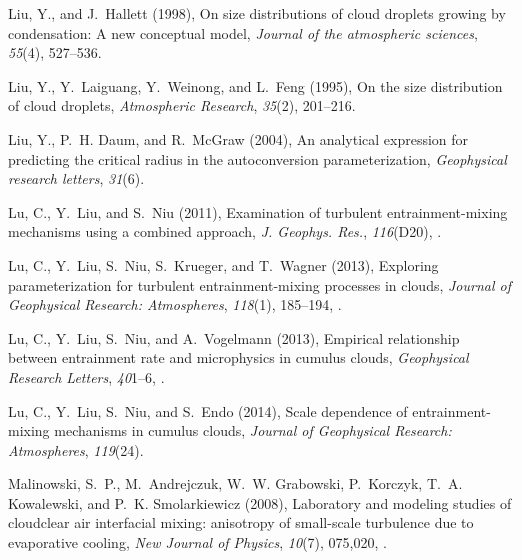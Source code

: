 \documentclass[draft,linenumbers]{agujournal}
\begin{document}
\begin{thebibliography}{60}
Liu, Y., and J.~Hallett (1998), On size distributions of cloud droplets growing
  by condensation: A new conceptual model, \textit{Journal of the atmospheric
  sciences}, \textit{55}(4), 527--536.

Liu, Y., Y.~Laiguang, Y.~Weinong, and L.~Feng (1995), On the size distribution
  of cloud droplets, \textit{Atmospheric Research}, \textit{35}(2), 201--216.

Liu, Y., P.~H. Daum, and R.~McGraw (2004), An analytical expression for
  predicting the critical radius in the autoconversion parameterization,
  \textit{Geophysical research letters}, \textit{31}(6).

Lu, C., Y.~Liu, and S.~Niu (2011), Examination of turbulent entrainment-mixing
  mechanisms using a combined approach, \textit{J. Geophys. Res.},
  \textit{116}(D20), .

Lu, C., Y.~Liu, S.~Niu, S.~Krueger, and T.~Wagner (2013{}), Exploring
  parameterization for turbulent entrainment-mixing processes in clouds,
  \textit{Journal of Geophysical Research: Atmospheres}, \textit{118}(1),
  185--194, .

Lu, C., Y.~Liu, S.~Niu, and A.~Vogelmann (2013{}), Empirical relationship between entrainment rate and microphysics in cumulus clouds, \textit{Geophysical Research Letters}, \textit{40}1--6, .
  
Lu, C., Y.~Liu, S.~Niu, and S.~Endo (2014), Scale dependence of
  entrainment-mixing mechanisms in cumulus clouds, \textit{Journal of
  Geophysical Research: Atmospheres}, \textit{119}(24).

Malinowski, S.~P., M.~Andrejczuk, W.~W. Grabowski, P.~Korczyk, T.~A.
  Kowalewski, and P.~K. Smolarkiewicz (2008), Laboratory and modeling studies
  of cloud{\textendash}clear air interfacial mixing: anisotropy of small-scale
  turbulence due to evaporative cooling, \textit{New Journal of Physics},
  \textit{10}(7), 075,020, .


\end{thebibliography}
\end{document}
